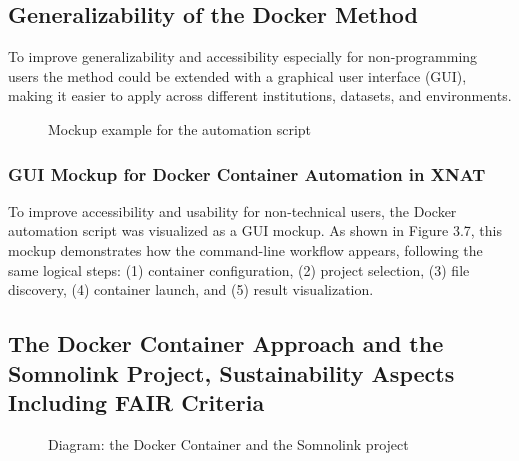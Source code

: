 \subsection{Generalizability of the Docker Method}

To improve generalizability and accessibility especially for non-programming users the method could be extended with a graphical user interface (GUI), making it easier to apply across different institutions, datasets, and environments. 

\begin{figure}[H]
    \centering
    \def\svgwidth{\linewidth} 
    
    \caption{Mockup example for the automation script}
    \label{fig:workflowxnat}
\end{figure}
\normalsize
\subsubsection{GUI Mockup for Docker Container Automation in XNAT}

To improve accessibility and usability for non-technical users, the Docker automation script was visualized as a GUI mockup. As shown in Figure 3.7, this mockup demonstrates how the command-line workflow appears, following the same logical steps: (1) container configuration, (2) project selection, (3) file discovery, (4) container launch, and (5) result visualization.

\subsection{The Docker Container Approach and the Somnolink Project, Sustainability Aspects Including FAIR Criteria}
\begin{figure}[H]
    \centering
    \def\svgwidth{\linewidth} 
    
    \caption{Diagram: the Docker Container and the Somnolink project}
    \label{fig:somnolink}
\end{figure}

